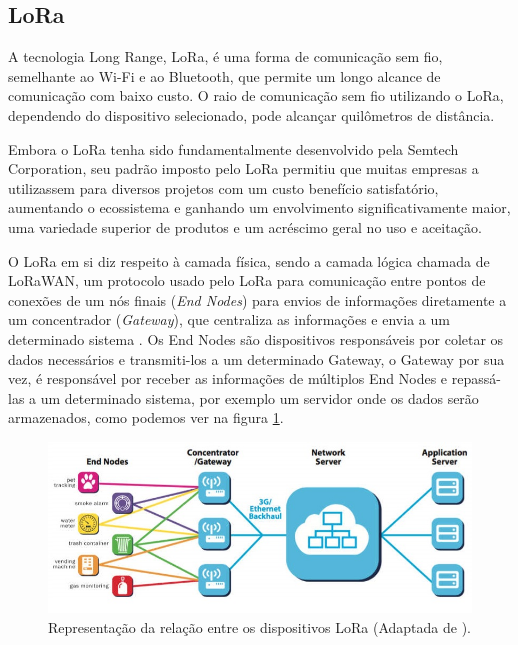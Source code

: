 \subsection{LoRa}
\label{fund:lora}
A tecnologia Long Range, LoRa, é uma forma de comunicação sem fio, semelhante ao Wi-Fi e ao Bluetooth, que permite um longo alcance de comunicação com baixo custo. O raio de comunicação sem fio utilizando o LoRa, dependendo do dispositivo selecionado, pode alcançar quilômetros de distância.

Embora o LoRa tenha sido fundamentalmente desenvolvido pela Semtech Corporation, seu padrão imposto pelo LoRa permitiu que muitas empresas a utilizassem para diversos projetos com um custo benefício satisfatório, aumentando o ecossistema e ganhando um envolvimento significativamente maior, uma variedade superior de produtos e um acréscimo geral no uso e aceitação. 

O LoRa em si diz respeito à camada física, sendo a camada lógica chamada de LoRaWAN, um protocolo usado pelo LoRa para comunicação entre pontos de conexões de um nós finais (\textit{End Nodes}) para envios de informações diretamente a um concentrador (\textit{Gateway}), que centraliza as informações e envia a um determinado sistema \cite{lora2021specification}. Os End Nodes são dispositivos responsáveis por coletar os dados necessários e transmiti-los a um determinado Gateway, o Gateway por sua vez, é responsável por receber as informações de múltiplos End Nodes e repassá-las a um determinado sistema, por exemplo um servidor onde os dados serão armazenados, como podemos ver na figura \ref{fig:end-nodes-gateways}.

\begin{figure}[H]
  \centering
  \includegraphics[width=.80\textwidth]{assets/lora-network-architecture.png} 
  \caption{Representação da relação entre os dispositivos LoRa (Adaptada de \cite{lora2021architecture}).}
  \label{fig:end-nodes-gateways} 
\end{figure}

